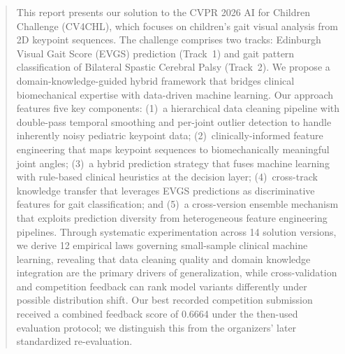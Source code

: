 \begin{abstract}
This report presents our solution to the CVPR 2026 AI for Children Challenge (CV4CHL), which focuses on children's gait visual analysis from 2D keypoint sequences. The challenge comprises two tracks: Edinburgh Visual Gait Score (EVGS) prediction (Track~1) and gait pattern classification of Bilateral Spastic Cerebral Palsy (Track~2). We propose a domain-knowledge-guided hybrid framework that bridges clinical biomechanical expertise with data-driven machine learning. Our approach features five key components: (1)~a hierarchical data cleaning pipeline with double-pass temporal smoothing and per-joint outlier detection to handle inherently noisy pediatric keypoint data; (2)~clinically-informed feature engineering that maps keypoint sequences to biomechanically meaningful joint angles; (3)~a hybrid prediction strategy that fuses machine learning with rule-based clinical heuristics at the decision layer; (4)~cross-track knowledge transfer that leverages EVGS predictions as discriminative features for gait classification; and (5)~a cross-version ensemble mechanism that exploits prediction diversity from heterogeneous feature engineering pipelines. Through systematic experimentation across 14 solution versions, we derive 12 empirical laws governing small-sample clinical machine learning, revealing that data cleaning quality and domain knowledge integration are the primary drivers of generalization, while cross-validation and competition feedback can rank model variants differently under possible distribution shift. Our best recorded competition submission received a combined feedback score of 0.6664 under the then-used evaluation protocol; we distinguish this from the organizers' later standardized re-evaluation.
\end{abstract}
